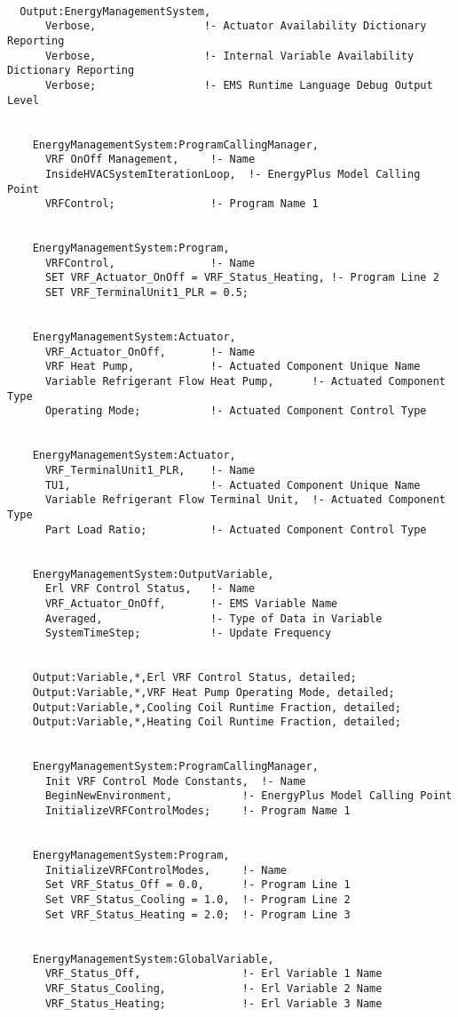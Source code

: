 \begin{lstlisting}

  Output:EnergyManagementSystem,
      Verbose,                 !- Actuator Availability Dictionary Reporting
      Verbose,                 !- Internal Variable Availability Dictionary Reporting
      Verbose;                 !- EMS Runtime Language Debug Output Level


    EnergyManagementSystem:ProgramCallingManager,
      VRF OnOff Management,     !- Name
      InsideHVACSystemIterationLoop,  !- EnergyPlus Model Calling Point
      VRFControl;               !- Program Name 1


    EnergyManagementSystem:Program,
      VRFControl,               !- Name
      SET VRF_Actuator_OnOff = VRF_Status_Heating, !- Program Line 2
      SET VRF_TerminalUnit1_PLR = 0.5;


    EnergyManagementSystem:Actuator,
      VRF_Actuator_OnOff,       !- Name
      VRF Heat Pump,            !- Actuated Component Unique Name
      Variable Refrigerant Flow Heat Pump,      !- Actuated Component Type
      Operating Mode;           !- Actuated Component Control Type


    EnergyManagementSystem:Actuator,
      VRF_TerminalUnit1_PLR,    !- Name
      TU1,                      !- Actuated Component Unique Name
      Variable Refrigerant Flow Terminal Unit,  !- Actuated Component Type
      Part Load Ratio;          !- Actuated Component Control Type


    EnergyManagementSystem:OutputVariable,
      Erl VRF Control Status,   !- Name
      VRF_Actuator_OnOff,       !- EMS Variable Name
      Averaged,                 !- Type of Data in Variable
      SystemTimeStep;           !- Update Frequency


    Output:Variable,*,Erl VRF Control Status, detailed;
    Output:Variable,*,VRF Heat Pump Operating Mode, detailed;
    Output:Variable,*,Cooling Coil Runtime Fraction, detailed;
    Output:Variable,*,Heating Coil Runtime Fraction, detailed;


    EnergyManagementSystem:ProgramCallingManager,
      Init VRF Control Mode Constants,  !- Name
      BeginNewEnvironment,           !- EnergyPlus Model Calling Point
      InitializeVRFControlModes;     !- Program Name 1


    EnergyManagementSystem:Program,
      InitializeVRFControlModes,     !- Name
      Set VRF_Status_Off = 0.0,      !- Program Line 1
      Set VRF_Status_Cooling = 1.0,  !- Program Line 2
      Set VRF_Status_Heating = 2.0;  !- Program Line 3


    EnergyManagementSystem:GlobalVariable,
      VRF_Status_Off,                !- Erl Variable 1 Name
      VRF_Status_Cooling,            !- Erl Variable 2 Name
      VRF_Status_Heating;            !- Erl Variable 3 Name
\end{lstlisting}
